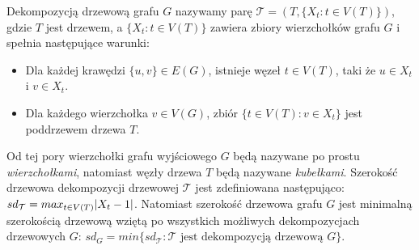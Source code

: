 \documentclass[12pt, oneside]{report}
\begin{document}
Dekompozycją drzewową grafu $G$ nazywamy parę $\mathcal{T} = (T, \{X_t : t \in V(T)\})$, gdzie $T$ jest drzewem, a $\{X_t : t \in V(T)\}$
zawiera zbiory wierzchołków grafu $G$ i spełnia następujące warunki:
\begin{itemize}
	\item{Dla każdej krawędzi $\{u, v\} \in E(G)$, istnieje węzeł $t \in V(T)$, taki że $u \in X_t$ i $v \in X_t$.}
	\item{Dla każdego wierzchołka $v \in V(G)$, zbiór $\{t \in V(T): v \in X_t \}$ jest poddrzewem drzewa $T$.}
\end{itemize}
Od tej pory wierzchołki grafu wyjściowego $G$ będą nazywane po prostu \emph{wierzchołkami}, natomiast węzły drzewa $T$ będą nazywane \emph{kubełkami}.
\newline\newline
Szerokość drzewowa dekompozycji drzewowej $\mathcal{T}$ jest zdefiniowana następująco: \newline $sd_\mathcal{T} = max_{t \in V(T)} \abs{X_t - 1}$. Natomiast szerokość drzewowa grafu $G$ jest minimalną szerokością drzewową wziętą po wszystkich możliwych dekompozycjach drzewowych $G$: \newline $sd_G = min \{sd_\mathcal{T}: \mathcal{T} \text{ jest dekompozycją drzewową }G\}$.
  		
\end{document}
